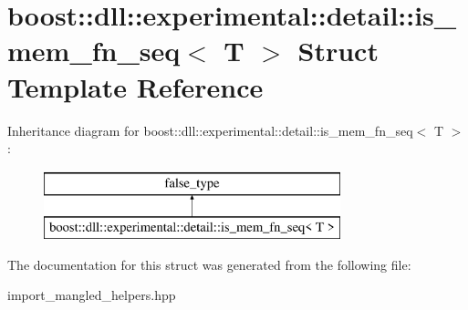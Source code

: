 \hypertarget{a00173}{}\section{boost\+:\+:dll\+:\+:experimental\+:\+:detail\+:\+:is\+\_\+mem\+\_\+fn\+\_\+seq$<$ T $>$ Struct Template Reference}
\label{a00173}
Inheritance diagram for boost\+:\+:dll\+:\+:experimental\+:\+:detail\+:\+:is\+\_\+mem\+\_\+fn\+\_\+seq$<$ T $>$\+:\begin{figure}[H]
\begin{center}
\leavevmode
\includegraphics[height=2.000000cm]{a00173}
\end{center}
\end{figure}


The documentation for this struct was generated from the following file\+:\begin{DoxyCompactItemize}
\item 
import\+\_\+mangled\+\_\+helpers.\+hpp\end{DoxyCompactItemize}
